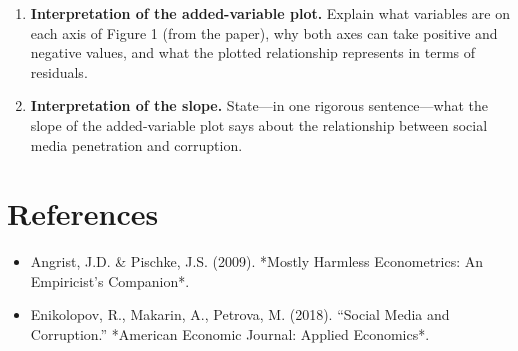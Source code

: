 \documentclass[12pt,a4paper]{article}
\begin{document}
\begin{enumerate}[label=(\alph*)]

\item \textbf{Interpretation of the added-variable plot.}  
Explain what variables are on each axis of Figure 1 (from the paper),  
why both axes can take positive and negative values,  
and what the plotted relationship represents in terms of residuals.


\item \textbf{Interpretation of the slope.}  
State—in one rigorous sentence—what the slope of the added-variable plot says  
about the relationship between social media penetration and corruption.
\end{enumerate}











\section*{References}
\begin{itemize}
  \item Angrist, J.D. \& Pischke, J.S. (2009). *Mostly Harmless Econometrics: An Empiricist’s Companion*.  
  \item Enikolopov, R., Makarin, A., Petrova, M. (2018). “Social Media and Corruption.” *American Economic Journal: Applied Economics*.
\end{itemize}
\end{document}
